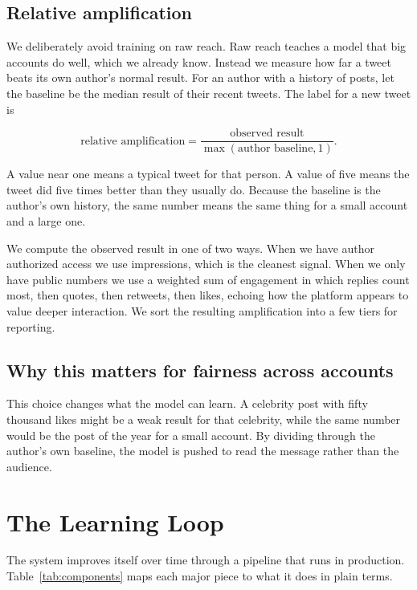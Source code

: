 \documentclass[11pt]{article}
\begin{document}
\subsection{Relative amplification}
We deliberately avoid training on raw reach. Raw reach teaches a model that big
accounts do well, which we already know. Instead we measure how far a tweet beats
its own author's normal result. For an author with a history of posts, let the
baseline be the median result of their recent tweets. The label for a new tweet
is

\begin{equation}
\text{relative amplification} = \frac{\text{observed result}}{\max(\text{author baseline}, 1)}.
\end{equation}

A value near one means a typical tweet for that person. A value of five means the
tweet did five times better than they usually do. Because the baseline is the
author's own history, the same number means the same thing for a small account
and a large one.

We compute the observed result in one of two ways. When we have author authorized
access we use impressions, which is the cleanest signal. When we only have public
numbers we use a weighted sum of engagement in which replies count most, then
quotes, then retweets, then likes, echoing how the platform appears to value
deeper interaction. We sort the resulting amplification into a few tiers for
reporting.

\subsection{Why this matters for fairness across accounts}
This choice changes what the model can learn. A celebrity post with fifty
thousand likes might be a weak result for that celebrity, while the same number
would be the post of the year for a small account. By dividing through the
author's own baseline, the model is pushed to read the message rather than the
audience.

\section{The Learning Loop}

The system improves itself over time through a pipeline that runs in production.
Table~\ref{tab:components} maps each major piece to what it does in plain terms.
\end{document}
